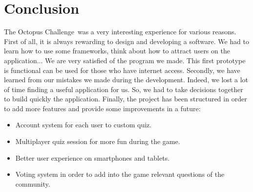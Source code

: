 \documentclass[a4paper,11pt, oneside]{book}
\def\appName{The Octopus Challenge}
\def\octopusName{Lord Octopus}
\begin{document}
%


\chapter{Conclusion}
\appName \ was a very interesting experience for various reasons.
First of all, it is always rewarding to design and developing a software. We had to learn how to use some frameworks, think about how to attract users on the application...
We are very satisfied of the program we made. This first prototype is functional can be used for those who have internet access. Secondly, we have learned from our mistakes we made during the development.
Indeed, we lost a lot of time finding a useful application for us. So, we had to take decisions together to build quickly the application. Finally, the project has been structured in order
to add more features and provide some improvements in a future:
\begin{itemize}
	\item Account system for each user to custom quiz.
	\item Multiplayer quiz session for more fun during the game.
	\item Better user experience on smartphones and tablets.
	\item Voting system in order to add into the game relevant questions of the community.
\end{itemize}
\end{document}
